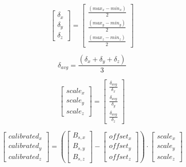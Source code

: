 \begin{equation}
    \label{eq:soft-iron_1}
    \begin{bmatrix} \delta_{x} \\ \delta_{y} \\ \delta_{z} \end{bmatrix} = \begin{bmatrix} \frac{(max_{x} - min_{x})}{2} \\ \frac{(max_{y} - min_{y})}{2} \\ \frac{(max_{z} - min_{z})}{2}\end{bmatrix}
\end{equation}

\begin{equation}
    \label{eq:soft_iron_2}
    \delta_{avg} = \frac{(\delta_{x} + \delta_{y} + \delta_{z})}{3}
\end{equation}

\begin{equation}
    \label{eq:soft-iron_3}
    \begin{bmatrix} scale_{x} \\ scale_{y} \\ scale_{z} \end{bmatrix} = \begin{bmatrix} \frac{\delta_{avg}}{\delta_{x}} \\ \frac{\delta_{avg}}{\delta_{y}} \\ \frac{\delta_{avg}}{\delta_{z}}\end{bmatrix}
\end{equation}

\begin{equation}
    \label{eq:calibrate}
    \begin{bmatrix} calibrated_{x} \\ calibrated_{y} \\ calibrated_{z} \end{bmatrix} = \left(\begin{bmatrix} B_{s,x} \\ B_{s,y} \\ B_{s,z} \end{bmatrix} - \begin{bmatrix} offset_{x} \\ offset_{y} \\ offset_{z} \end{bmatrix}\right) \cdot \begin{bmatrix} scale_{x} \\ scale_{y} \\ scale_{z} \end{bmatrix}
\end{equation}
    
